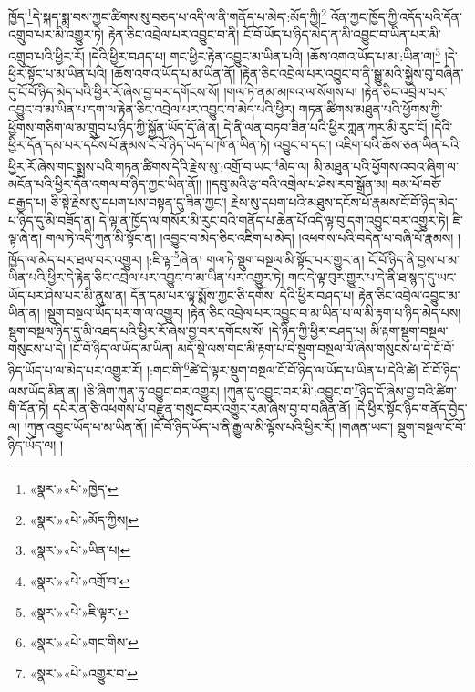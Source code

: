ཁྱོད་\footnote{«སྣར་»«པེ་»ཁྱེད་}དེ་སྐད་སྨྲ་བས་ཀྱང་ཚིགས་སུ་བཅད་པ་འདི་ལ་ནི་གནོད་པ་མེད་:མོད་ཀྱི།\footnote{«སྣར་»«པེ་»མོད་ཀྱིས།} འོན་ཀྱང་ཁྱོད་ཀྱི་འདོད་པའི་དོན་འགྲུབ་པར་མི་འགྱུར་ཏེ། རྟེན་ཅིང་འབྲེལ་པར་འབྱུང་བ་ནི། ངོ་བོ་ཡོད་པ་ཉིད་མེད་ན་མི་འབྱུང་བ་ཡིན་པར་མི་འགྲུབ་པའི་ཕྱིར་རོ། །དེའི་ཕྱིར་བཤད་པ། གང་ཕྱིར་རྟེན་འབྱུང་མ་ཡིན་པའི། །ཆོས་འགའ་ཡོད་པ་མ་:ཡིན་ལ།\footnote{«སྣར་»«པེ་»ཡིན་པ།} །དེ་ཕྱིར་སྟོང་པ་མ་ཡིན་པའི། །ཆོས་འགའ་ཡོད་པ་མ་ཡིན་ནོ། །རྟེན་ཅིང་འབྲེལ་པར་འབྱུང་བ་ནི་སྒྱུ་མའི་སྐྱེས་བུ་བཞིན་དུ་ངོ་བོ་ཉིད་མེད་པའི་ཕྱིར་རོ་ཞེས་བྱ་བར་དགོངས་སོ། །གལ་ཏེ་ནམ་མཁའ་ལ་སོགས་པ། །རྟེན་ཅིང་འབྲེལ་པར་འབྱུང་བ་མ་ཡིན་པ་དག་ལ་རྟེན་ཅིང་འབྲེལ་པར་འབྱུང་བ་མེད་པའི་ཕྱིར། གཏན་ཚིགས་མཐུན་པའི་ཕྱོགས་ཀྱི་ཕྱོགས་གཅིག་ལ་མ་གྲུབ་པ་ཉིད་ཀྱི་སྐྱོན་ཡོད་དོ་ཞེ་ན། དེ་ནི་ལན་བཏབ་ཟིན་པའི་ཕྱིར་ཀླན་ཀར་མི་རུང་ངོ། །དེའི་ཕྱིར་དོན་དམ་པར་དངོས་པོ་རྣམས་ངོ་བོ་ཉིད་ཡོད་པ་ཁོ་ན་ཡིན་ཏེ། འབྱུང་བ་དང་། འཇིག་པའི་ཆོས་ཅན་ཡིན་པའི་ཕྱིར་རོ་ཞེས་གང་སྨྲས་པའི་གཏན་ཚིགས་དེའི་རྗེས་སུ་:འགྲོ་བ་ཡང་\footnote{«སྣར་»«པེ་»འགྲོ་བ་}མེད་ལ། མི་མཐུན་པའི་ཕྱོགས་འབའ་ཞིག་ལ་མངོན་པའི་ཕྱིར་དོན་འགལ་བ་ཉིད་ཀྱང་ཡིན་ནོ།། །།དབུ་མའི་རྩ་བའི་འགྲེལ་པ་ཤེས་རབ་སྒྲོན་མ། བམ་པོ་བཅོ་བརྒྱད་པ། ཅི་སྟེ་རྗེས་སུ་དཔག་པས་བསྟན་དུ་ཟིན་ཀྱང་། རྗེས་སུ་དཔག་པའི་མཐུས་དངོས་པོ་རྣམས་ངོ་བོ་ཉིད་མེད་པ་ཉིད་དུ་མི་བཟོད་ན། དེ་ལྟ་ན་ཁྱོད་ལ་གསོར་མི་རུང་བའི་གནོད་པ་ཆེན་པོ་འདི་ལྟ་བུ་དག་འབྱུང་བར་འགྱུར་ཏེ། ཇི་ལྟ་ཞེ་ན། གལ་ཏེ་འདི་ཀུན་མི་སྟོང་ན། །འབྱུང་བ་མེད་ཅིང་འཇིག་པ་མེད། །འཕགས་པའི་བདེན་པ་བཞི་པོ་རྣམས། །ཁྱོད་ལ་མེད་པར་ཐལ་བར་འགྱུར། །:ཇི་ལྟ་\footnote{«སྣར་»«པེ་»ཇི་ལྟར་}ཞེ་ན། གལ་ཏེ་སྡུག་བསྔལ་མི་སྟོང་པར་གྱུར་ན། ངོ་བོ་ཉིད་ནི་བྱས་པ་མ་ཡིན་པའི་ཕྱིར་དེ་རྟེན་ཅིང་འབྲེལ་པར་འབྱུང་བ་མ་ཡིན་པར་འགྱུར་ཏེ། གང་དེ་ལྟ་བུར་གྱུར་པ་དེ་ནི་ཐ་སྙད་དུ་ཡང་ཡོད་པར་ཤེས་པར་མི་ནུས་ན། དོན་དམ་པར་ལྟ་སྨོས་ཀྱང་ཅི་དགོས། དེའི་ཕྱིར་བཤད་པ། རྟེན་ཅིང་འབྲེལ་འབྱུང་མ་ཡིན་ན། །སྡུག་བསྔལ་ཡོད་པར་ག་ལ་འགྱུར། །རྟེན་ཅིང་འབྲེལ་པར་འབྱུང་བ་མ་ཡིན་པ་ལ་མི་རྟག་པ་ཉིད་མེད་པས། སྡུག་བསྔལ་ཉིད་དུ་མི་འཐད་པའི་ཕྱིར་རོ་ཞེས་བྱ་བར་དགོངས་སོ། །དེ་ཉིད་ཀྱི་ཕྱིར་བཤད་པ། མི་རྟག་སྡུག་བསྔལ་གསུངས་པ་དེ། །ངོ་བོ་ཉིད་ལ་ཡོད་མ་ཡིན། མདོ་སྡེ་ལས་གང་མི་རྟག་པ་དེ་སྡུག་བསྔལ་ལོ་ཞེས་གསུངས་པ་དེ་ངོ་བོ་ཉིད་ཡོད་པ་ལ་མེད་པར་འགྱུར་རོ། །:གང་གི་\footnote{«སྣར་»«པེ་»གང་གིས་}ཚེ་དེ་ལྟར་སྡུག་བསྔལ་ངོ་བོ་ཉིད་ལ་ཡོད་པ་ཡིན་པ་དེའི་ཚེ། ངོ་བོ་ཉིད་ལས་ཡོད་མིན་ན། །ཅི་ཞིག་ཀུན་ཏུ་འབྱུང་བར་འགྱུར། །ཀུན་དུ་འབྱུང་བར་མི་:འབྱུང་བ་\footnote{«སྣར་»«པེ་»འགྱུར་བ་}ཉིད་དོ་ཞེས་བྱ་བའི་ཚིག་གི་དོན་ཏེ། དཔེར་ན་ཅི་འཕགས་པ་བརྫུན་གསུང་བར་འགྱུར་རམ་ཞེས་བྱ་བ་བཞིན་ནོ། །དེ་ཕྱིར་སྟོང་ཉིད་གནོད་བྱེད་ལ། །ཀུན་འབྱུང་ཡོད་པ་མ་ཡིན་ནོ། །ངོ་བོ་ཉིད་ཡོད་པ་ནི་རྒྱུ་ལ་མི་ལྟོས་པའི་ཕྱིར་རོ། །གཞན་ཡང་། སྡུག་བསྔལ་ངོ་བོ་ཉིད་ཡོད་ལ། །
